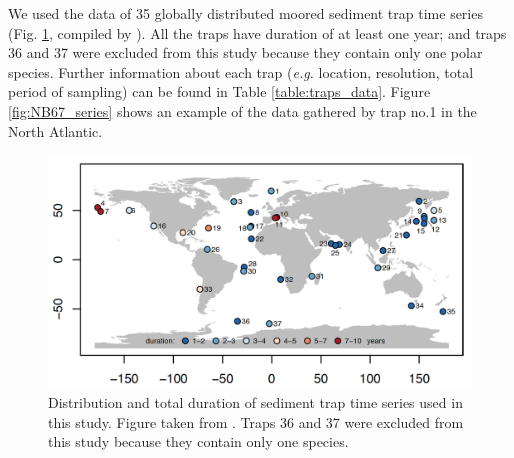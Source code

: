 We used the data of 35 globally distributed moored sediment trap time series (Fig. \ref{fig:map}, compiled by \citealt{jonkers2015global}). All the traps have duration of at least one year; and traps 36 and 37 were excluded from this study because they contain only one polar species. Further information about each trap (\textit{e.g.} location, resolution, total period of sampling) can be found in Table \ref{table:traps_data}. Figure \ref{fig:NB67_series} shows an example of the data gathered by trap no.1 in the North Atlantic. 

\begin{figure}
\centering
\includegraphics[width=1\textwidth]{traps_map.png}
\caption{\label{fig:map} Distribution and total duration of sediment trap time series used in this study. Figure taken from \citep{jonkers2015global}. Traps 36 and 37 were excluded from this study because they contain only one species.}
\end{figure}

\begin{table}
\footnotesize
\caption{\label{table:traps_data} Meta-data of sediment traps taken from \citep{jonkers2015global}. Columns: \textbf{Trap number} as in Figure \ref{fig:map}; \textbf{Trap name}; Coordinates (\textbf{Lat, Lon}); \textbf{resolution}: mean period (in days) that each sample (bottle) in the trap was open; \textbf{length days}: total period trap was open (in days); \textbf{length years}: total period in years; \textbf{length series}: total number of samples collected in each trap (length of the time-series); \textbf{from, to}: year interval when trap was active; \textbf{all ssp}: whether all species were identified in each trap, "NO" means that just dominant species were picked.}
\makebox[\linewidth]{ %

}
\end{table}


